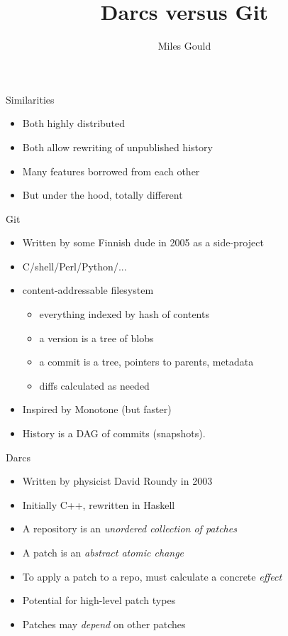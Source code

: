 \documentclass[pdf]{prosper}
\title{Darcs versus Git}
\author{Miles Gould}
\begin{document}
\maketitle
\begin{slide}{Similarities}
\begin{itemize}
\item Both highly distributed
\item Both allow rewriting of unpublished history
\item Many features borrowed from each other
\item But under the hood, totally different
\end{itemize}
\end{slide}
\begin{slide}{Git}
\begin{itemize}
\item Written by some Finnish dude in 2005 as a side-project
\item C/shell/Perl/Python/...
\item content-addressable filesystem
\begin{itemize}
	\item everything indexed by hash of contents
	\item a version is a tree of blobs
	\item a commit is a tree, pointers to parents, metadata
	\item diffs calculated as needed
\end{itemize}
\item Inspired by Monotone (but faster)
\item History is a DAG of commits (snapshots).
\end{itemize}
\end{slide}
\begin{slide}{Darcs}
\begin{itemize}
\item Written by physicist David Roundy in 2003
\item Initially C++, rewritten in Haskell
\item A repository is an \emph{unordered collection of patches}
\item A patch is an \emph{abstract atomic change}
\item To apply a patch to a repo, must calculate a concrete \emph{effect}
\item Potential for high-level patch types
\item Patches may \emph{depend} on other patches
\end{itemize}
\end{slide}
\end{document}
